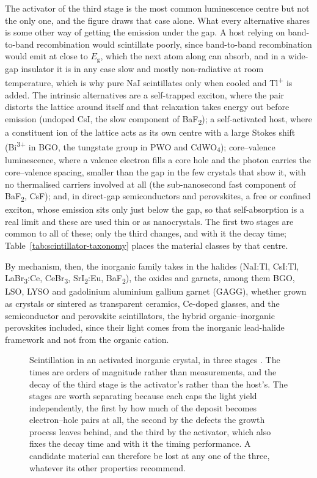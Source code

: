 The activator of the third stage is the most common luminescence centre but not the only one, and the figure draws that case alone.
What every alternative shares is some other way of getting the emission under the gap.
A host relying on band-to-band recombination would scintillate poorly, since band-to-band recombination would emit at close to $E_\mathrm{g}$, which the next atom along can absorb, and in a wide-gap insulator it is in any case slow and mostly non-radiative at room temperature, which is why pure NaI scintillates only when cooled and Tl\textsuperscript{+} is added.
The intrinsic alternatives are a self-trapped exciton, where the pair distorts the lattice around itself and that relaxation takes energy out before emission (undoped CsI, the slow component of BaF\textsubscript{2}); a self-activated host, where a constituent ion of the lattice acts as its own centre with a large Stokes shift (Bi\textsuperscript{3+} in BGO, the tungstate group in PWO and CdWO\textsubscript{4}); core--valence luminescence, where a valence electron fills a core hole and the photon carries the core--valence spacing, smaller than the gap in the few crystals that show it, with no thermalised carriers involved at all (the sub-nanosecond fast component of BaF\textsubscript{2}, CsF); and, in direct-gap semiconductors and perovskites, a free or confined exciton, whose emission sits only just below the gap, so that self-absorption is a real limit and these are used thin or as nanocrystals.
The first two stages are common to all of these; only the third changes, and with it the decay time; Table~\ref{tab:scintillator-taxonomy} places the material classes by that centre.

By mechanism, then, the inorganic family takes in the halides (NaI:Tl, CsI:Tl, LaBr\textsubscript{3}:Ce, CeBr\textsubscript{3}, SrI\textsubscript{2}:Eu, BaF\textsubscript{2}), the oxides and garnets, among them BGO, LSO, LYSO and gadolinium aluminium gallium garnet (GAGG), whether grown as crystals or sintered as transparent ceramics, Ce-doped glasses, and the semiconductor and perovskite scintillators, the hybrid organic--inorganic perovskites included, since their light comes from the inorganic lead-halide framework and not from the organic cation.

\begin{figure}[tbp]
	\centering
	
	\caption[The three stages of inorganic scintillation]{%
		Scintillation in an activated inorganic crystal, in three stages \cite{Rodnyi1997}.
		The times are orders of magnitude rather than measurements, and the decay of the third stage is the activator's rather than the host's.
		The stages are worth separating because each caps the light yield independently, the first by how much of the deposit becomes electron--hole pairs at all, the second by the defects the growth process leaves behind, and the third by the activator, which also fixes the decay time and with it the timing performance.
		A candidate material can therefore be lost at any one of the three, whatever its other properties recommend.}
	\label{fig:scintillation-process}
\end{figure}

